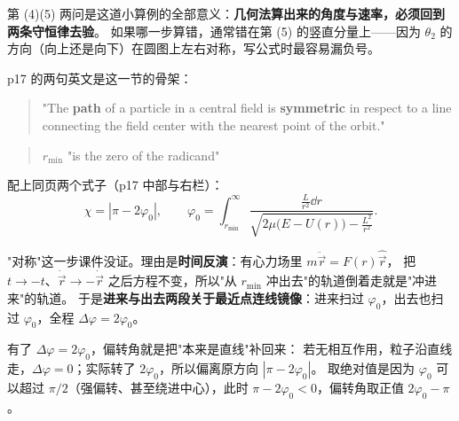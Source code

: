 \documentclass[11pt]{ctexart}
\providecommand{\th}{}\renewcommand{\th}{\theta}
\begin{document}
第 (4)(5) 两问是这道小算例的全部意义：\textbf{几何法算出来的角度与速率，必须回到两条守恒律去验}。
如果哪一步算错，通常错在第 (5) 的竖直分量上——因为 $\th_2$ 的方向（向上还是向下）在圆图上左右对称，写公式时最容易漏负号。



p17 的两句英文是这一节的骨架：

\begin{quote}
"The \textbf{path} of a particle in a central field is \textbf{symmetric} in respect to a line connecting the field center with the nearest point of the orbit."
\end{quote}
\begin{quote}
$r_{\min}$ "is the zero of the radicand"
\end{quote}
配上同页两个式子（p17 中部与右栏）：
\[
\chi=|\pi-2\varphi_0|,\qquad
\varphi_0=\int_{r_{\min}}^{\infty}\frac{\frac{L}{r^2}\dd r}{\sqrt{2\mu\bigl(E-U(r)\bigr)-\frac{L^2}{r^2}}} .
\]

"对称"这一步课件没证。理由是\textbf{时间反演}：有心力场里 $m\ddot{\vec r}=F(r)\hat{\vec r}$，
把 $t\to-t$、$\dot{\vec r}\to-\dot{\vec r}$ 之后方程不变，所以"从 $r_{\min}$ 冲出去"的轨道倒着走就是"冲进来"的轨道。
于是\textbf{进来与出去两段关于最近点连线镜像}：进来扫过 $\varphi_0$，出去也扫过 $\varphi_0$，全程 $\Delta\varphi=2\varphi_0$。


有了 $\Delta\varphi=2\varphi_0$，偏转角就是把"本来是直线"补回来：
若无相互作用，粒子沿直线走，$\Delta\varphi=0$；实际转了 $2\varphi_0$，所以偏离原方向 $|\pi-2\varphi_0|$。
取绝对值是因为 $\varphi_0$ 可以超过 $\pi/2$（强偏转、甚至绕进中心），此时 $\pi-2\varphi_0<0$，偏转角取正值 $2\varphi_0-\pi$。

\end{document}

